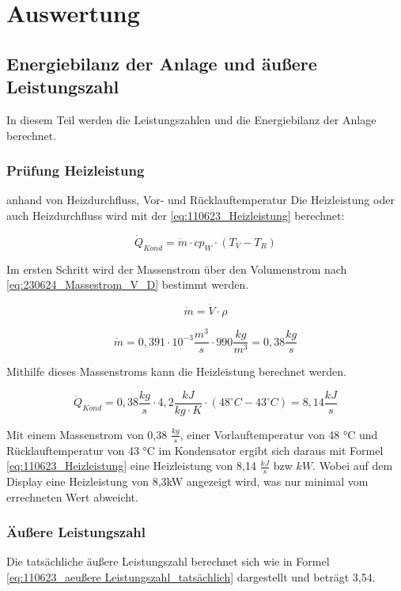 \section{Auswertung}
\label{sec:Auswertung}
\subsection{Energiebilanz der Anlage und äußere Leistungszahl}
In diesem Teil werden die Leistungszahlen und die Energiebilanz der Anlage berechnet.

\subsubsection{Prüfung Heizleistung}
\label{subsubsec:Heizleistung}
anhand von Heizdurchfluss, Vor- und Rücklauftemperatur
Die Heizleistung oder auch Heizdurchfluss wird mit der \autoref{eq:110623_Heizleistung} berechnet:

\begin{equation}
\dot Q_{Kond}= \dot m \cdot cp_{W} \cdot (T_{V} - T_{R})
\label{eq:110623_Heizleistung}
\end{equation}

Im ersten Schritt wird der Massenstrom über den Volumenstrom nach \autoref{eq:230624_Massestrom_V_D} bestimmt werden.

\begin{equation}
    \dot{m}= \dot{V}\cdot \rho
    \label{eq:230624_Massestrom_V_D}
\end{equation}

$$\dot{m}= 0,391 \cdot 10^{-3}\frac{m^3}{s} \cdot 990 \frac{kg}{m^3}=0,38 \frac{kg}{s}$$

Mithilfe dieses Massenstroms kann die Heizleistung berechnet werden.

$$\dot Q_{Kond}= 0,38 \frac{kg}{s} \cdot 4,2 \frac{kJ}{kg \cdot K} \cdot (48 ^{\circ}C - 43 ^{\circ}C) = 8,14 \frac{kJ}{s}$$

Mit einem Massenstrom von 0,38 $\frac{kg}{s}$, einer Vorlauftemperatur von 48 °C und Rücklauftemperatur von 43 °C im Kondensator ergibt sich daraus mit Formel \ref{eq:110623_Heizleistung} eine Heizleistung von 8,14 $\frac{kJ}{s}$ bzw $kW$. Wobei auf dem Display eine Heizleistung von 8,3kW angezeigt wird, was nur minimal vom errechneten Wert abweicht.
\subsubsection{Äußere Leistungszahl}
Die tatsächliche äußere Leistungszahl berechnet sich wie in Formel \ref{eq:110623_aeußere Leistungszahl_tatsächlich} dargestellt und beträgt 3,54.

